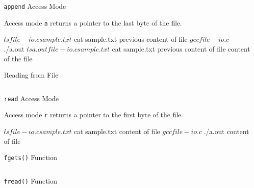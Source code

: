 \documentclass[compress]{beamer}
\begin{document}
\begin{slide}
	\begin{block}{\texttt{append} Access Mode}

	Access mode \alert{\texttt{a}} returns a pointer to the last byte of the file.

	\begin{terminal}
	$ ls
	file-io.c sample.txt
	$ cat sample.txt
	previous content of file
	$ gcc file-io.c
	$ ./a.out
	$ ls
	a.out file-io.c sample.txt
	$ cat sample.txt
	previous content of file
	content of the file
	\end{terminal}

	\end{block}
\end{slide}

\begin{slide}
	\begin{block}{Reading from File}

	\inputminted[fontsize=\scriptsize, firstline=10, linenos]{c}{
		\resDirectory/fileio-r1.c
	}

	\end{block}
\end{slide}

\begin{slide}
	\begin{block}{\texttt{read} Access Mode}

	Access mode \alert{\texttt{r}} returns a pointer to the first byte of the file.

	\begin{terminal}
	$ ls
	file-io.c sample.txt
	$ cat sample.txt
	content of file
	$ gcc file-io.c
	$ ./a.out
	content of file
	\end{terminal}

	\end{block}
\end{slide}

\begin{slide}
	\begin{block}{\texttt{fgets()} Function}

	\inputminted[fontsize=\scriptsize, firstline=10, linenos]{c}{
		\resDirectory/fileio-r2.c
	}

	\end{block}
\end{slide}

\begin{slide}
	\begin{block}{\texttt{fread()} Function}

	\inputminted[fontsize=\scriptsize, firstline=10, linenos]{c}{
		\resDirectory/fileio-r3.c
	}

	\end{block}
\end{slide}
\end{document}

